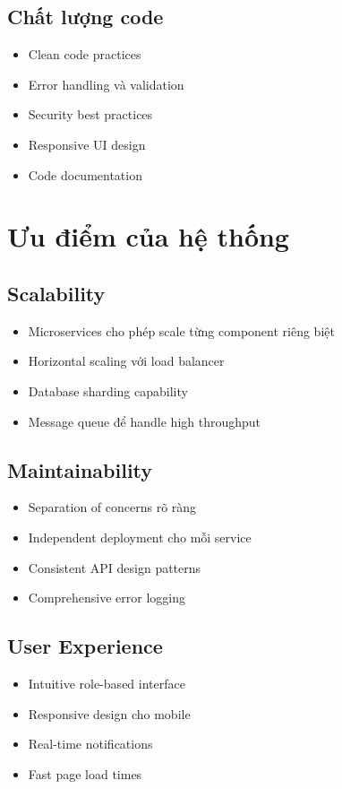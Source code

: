 \documentclass[12pt,a4paper]{report}
\begin{document}
\subsection{Chất lượng code}
\begin{itemize}
    \item Clean code practices
    \item Error handling và validation
    \item Security best practices
    \item Responsive UI design
    \item Code documentation
\end{itemize}

\section{Ưu điểm của hệ thống}

\subsection{Scalability}
\begin{itemize}
    \item Microservices cho phép scale từng component riêng biệt
    \item Horizontal scaling với load balancer
    \item Database sharding capability
    \item Message queue để handle high throughput
\end{itemize}

\subsection{Maintainability}
\begin{itemize}
    \item Separation of concerns rõ ràng
    \item Independent deployment cho mỗi service
    \item Consistent API design patterns
    \item Comprehensive error logging
\end{itemize}

\subsection{User Experience}
\begin{itemize}
    \item Intuitive role-based interface
    \item Responsive design cho mobile
    \item Real-time notifications
    \item Fast page load times
\end{itemize}
\end{document}
